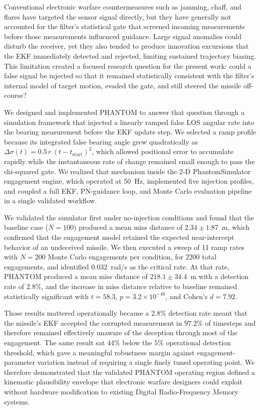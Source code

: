 \documentclass[journal]{IEEEtran}
\begin{document}
Conventional electronic warfare countermeasures such as jamming,
chaff, and flares have targeted the sensor signal directly, but they
have generally not accounted for the filter's statistical gate that
screened incoming measurements before those measurements influenced
guidance.  Large signal anomalies could disturb the receiver, yet
they also tended to produce innovation excursions that the EKF
immediately detected and rejected, limiting sustained trajectory
biasing.  This limitation created a focused research question for the
present work: could a false signal be injected so that it remained
statistically consistent with the filter's internal model of target
motion, evaded the gate, and still steered the missile off-course?

We designed and implemented PHANTOM to answer that question through a
simulation framework that injected a linearly ramped false LOS
angular rate into the bearing measurement before the EKF update step.
We selected a ramp profile because its integrated false bearing angle
grew quadratically as $\Delta \sigma(t) = 0.5\, r\, (t -
t_{\text{start}})^2$, which allowed positional error to accumulate
rapidly while the instantaneous rate of change remained small enough
to pass the chi-squared gate.  We realized that mechanism inside the
2-D PhantomSimulator engagement engine, which operated at 50~Hz,
implemented five injection profiles, and coupled a full EKF,
PN-guidance loop, and Monte Carlo evaluation pipeline in a single
validated workflow.

We validated the simulator first under no-injection conditions and
found that the baseline case ($N=100$) produced a mean miss distance
of $2.34 \pm 1.87$~m, which confirmed that the engagement model
retained the expected near-intercept behavior of an undeceived
missile.  We then executed a sweep of 11 ramp rates with $N=200$
Monte Carlo engagements per condition, for 2200 total engagements,
and identified $0.032$~rad/s as the critical rate.  At that rate,
PHANTOM produced a mean miss distance of $218.1 \pm 34.4$~m with a
detection rate of $2.8\%$, and the increase in miss distance relative
to baseline remained statistically significant with $t = 58.3$,
$p = 3.2 \times 10^{-48}$, and Cohen's $d = 7.92$.

Those results mattered operationally because a $2.8\%$ detection rate
meant that the missile's EKF accepted the corrupted measurement in
$97.2\%$ of timesteps and therefore remained effectively unaware of
the deception through most of the engagement.  The same result sat
$44\%$ below the $5\%$ operational detection threshold, which gave a
meaningful robustness margin against engagement-parameter variation
instead of requiring a single finely tuned operating point.  We
therefore demonstrated that the validated PHANTOM operating region
defined a kinematic plausibility envelope that electronic warfare
designers could exploit without hardware modification to existing
Digital Radio-Frequency Memory systems.
\end{document}
